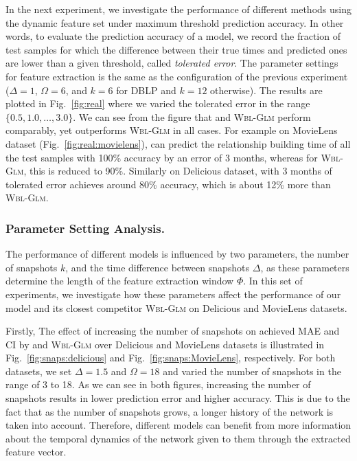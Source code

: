 In the next experiment, we investigate the performance of different methods using the dynamic feature set under maximum threshold prediction accuracy. In other words, to evaluate the prediction accuracy of a model, we record the fraction of test samples for which the difference between their true times and predicted ones are lower than a given threshold, called \emph{tolerated error}. The parameter settings for feature extraction is the same as the configuration of the previous experiment ($\Delta=1$, $\Omega=6$, and $k=6$ for DBLP and $k=12$ otherwise). The results are plotted in Fig.~\ref{fig:real} where we varied the tolerated error in the range $\{0.5, 1.0, \dots, 3.0\}$. We can see from the figure that \npglm and \textsc{Wbl-Glm} perform comparably, yet \npglm outperforms \textsc{Wbl-Glm} in all cases. For example on MovieLens dataset (Fig.~\ref{fig:real:movielens}), \npglm can predict the relationship building time of all the test samples with 100\% accuracy by an error of 3 months, whereas for \textsc{Wbl-Glm}, this is reduced to 90\%. Similarly on Delicious dataset, \npglm with 3 months of tolerated error achieves around 80\% accuracy, which is about 12\% more than \textsc{Wbl-Glm}.


\subsubsection{Parameter Setting Analysis.}
The performance of different models is influenced by two parameters, the number of snapshots $k$, and the time difference between snapshots $\Delta$, as these parameters determine the length of the feature extraction window $\Phi$. In this set of experiments, we investigate how these parameters affect the performance of our model \npglm and its closest competitor \textsc{Wbl-Glm} on Delicious and MovieLens datasets. 

Firstly, The effect of increasing the number of snapshots on achieved MAE and CI by \npglm and \textsc{Wbl-Glm} over Delicious and MovieLens datasets is illustrated in Fig.~\ref{fig:snaps:delicious} and Fig.~\ref{fig:snaps:MovieLens}, respectively. For both datasets, we set $\Delta=1.5$ and $\Omega=18$ and varied the number of snapshots in the range of 3 to 18. As we can see in both figures, increasing the number of snapshots results in lower prediction error and higher accuracy. This is due to the fact that as the number of snapshots grows, a longer history of the network is taken into account. Therefore, different models can benefit from more information about the temporal dynamics of the network given to them through the extracted feature vector.

